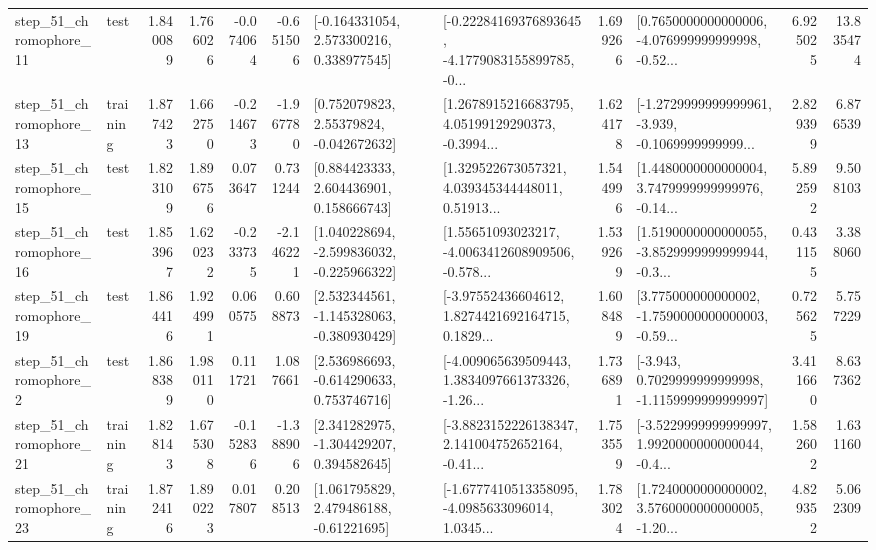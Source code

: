 \begin{tabular}{llrrrrllrlrr}
   step\_51\_chromophore\_11 &      test &      1.840089 &    1.766026 &     -0.074064 & -0.651506 &    [-0.164331054, 2.573300216, 0.338977545] &  [-0.22284169376893645, -4.1779083155899785, -0... &       1.699266 &  [0.7650000000000006, -4.076999999999998, -0.52... &            6.925025 &         13.835474 \\
   step\_51\_chromophore\_13 &  training &      1.877423 &    1.662750 &     -0.214673 & -1.967780 &     [0.752079823, 2.55379824, -0.042672632] &  [1.2678915216683795, 4.05199129290373, -0.3994... &       1.624178 &  [-1.2729999999999961, -3.939, -0.1069999999999... &            2.829399 &          6.876539 \\
   step\_51\_chromophore\_15 &      test &      1.823109 &    1.896756 &      0.073647 &  0.731244 &     [0.884423333, 2.604436901, 0.158666743] &  [1.329522673057321, 4.039345344448011, 0.51913... &       1.544996 &  [1.4480000000000004, 3.7479999999999976, -0.14... &            5.892592 &          9.508103 \\
   step\_51\_chromophore\_16 &      test &      1.853967 &    1.620232 &     -0.233735 & -2.146221 &   [1.040228694, -2.599836032, -0.225966322] &  [1.55651093023217, -4.0063412608909506, -0.578... &       1.539269 &  [1.5190000000000055, -3.8529999999999944, -0.3... &            0.431155 &          3.388060 \\
   step\_51\_chromophore\_19 &      test &      1.864416 &    1.924991 &      0.060575 &  0.608873 &   [2.532344561, -1.145328063, -0.380930429] &  [-3.97552436604612, 1.8274421692164715, 0.1829... &       1.608489 &  [3.775000000000002, -1.7590000000000003, -0.59... &            0.725625 &          5.757229 \\
    step\_51\_chromophore\_2 &      test &      1.868389 &    1.980110 &      0.111721 &  1.087661 &    [2.536986693, -0.614290633, 0.753746716] &  [-4.009065639509443, 1.3834097661373326, -1.26... &       1.736891 &  [-3.943, 0.7029999999999998, -1.1159999999999997] &            3.411660 &          8.637362 \\
   step\_51\_chromophore\_21 &  training &      1.828143 &    1.675308 &     -0.152836 & -1.388906 &    [2.341282975, -1.304429207, 0.394582645] &  [-3.8823152226138347, 2.141004752652164, -0.41... &       1.753559 &  [-3.5229999999999997, 1.9920000000000044, -0.4... &            1.582602 &          1.631160 \\
   step\_51\_chromophore\_23 &  training &      1.872416 &    1.890223 &      0.017807 &  0.208513 &     [1.061795829, 2.479486188, -0.61221695] &  [-1.6777410513358095, -4.0985633096014, 1.0345... &       1.783024 &  [1.7240000000000002, 3.5760000000000005, -1.20... &            4.829352 &          5.062309 \\

\end{tabular}
